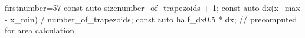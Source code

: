 \begin{cppcode*}{firstnumber=57}
    const auto size{number_of_trapezoids + 1};
    const auto dx{(x_max - x_min) / number_of_trapezoids};
    const auto half_dx{0.5 * dx}; // precomputed for area calculation
\end{cppcode*}
